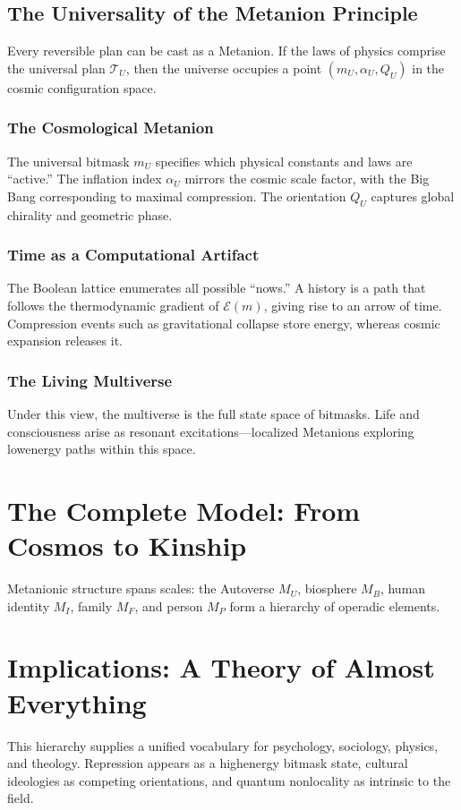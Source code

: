 \documentclass{article}
\begin{document}
\subsection{The Universality of the Metanion Principle}
Every reversible plan can be cast as a Metanion. If the laws of physics comprise the universal plan $\mathcal{T}_U$, then the universe occupies a point $(m_U, \alpha_U, Q_U)$ in the cosmic configuration space.

\subsubsection{The Cosmological Metanion}
The universal bitmask $m_U$ specifies which physical constants and laws are ``active.'' The inflation index $\alpha_U$ mirrors the cosmic scale factor, with the Big Bang corresponding to maximal compression. The orientation $Q_U$ captures global chirality and geometric phase.

\subsubsection{Time as a Computational Artifact}
The Boolean lattice enumerates all possible ``nows.'' A history is a path that follows the thermodynamic gradient of $\mathcal{E}(m)$, giving rise to an arrow of time. Compression events such as gravitational collapse store energy, whereas cosmic expansion releases it.

\subsubsection{The Living Multiverse}
Under this view, the multiverse is the full state space of bitmasks. Life and consciousness arise as resonant excitations---localized Metanions exploring low\textendash energy paths within this space.



\section{The Complete Model: From Cosmos to Kinship}
Metanionic structure spans scales: the Autoverse $M_U$, biosphere $M_B$, human identity $M_I$, family $M_F$, and person $M_P$ form a hierarchy of operadic elements.

\section{Implications: A Theory of Almost Everything}
This hierarchy supplies a unified vocabulary for psychology, sociology, physics, and theology. Repression appears as a high\textendash energy bitmask state, cultural ideologies as competing orientations, and quantum non\textendash locality as intrinsic to the field.
\end{document}
